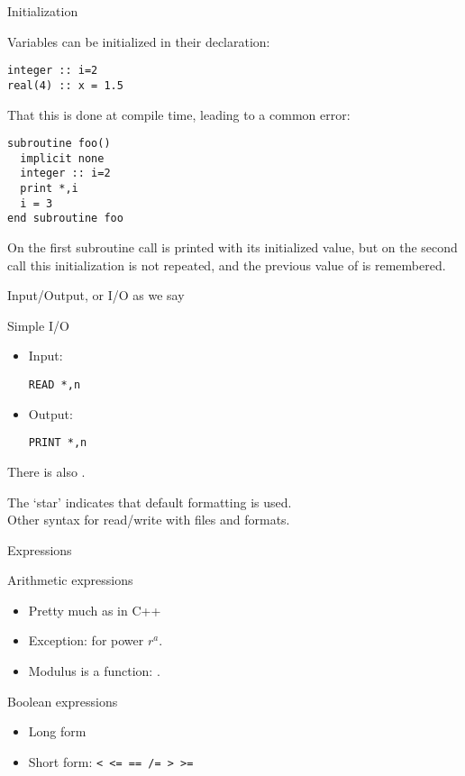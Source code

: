  {Initialization}

Variables can be initialized in their declaration:
\begin{lstlisting}
integer :: i=2
real(4) :: x = 1.5
\end{lstlisting}

That this is done at compile time, leading to a common error:
\begin{lstlisting}
subroutine foo()
  implicit none
  integer :: i=2
  print *,i
  i = 3
end subroutine foo
\end{lstlisting}
On the first subroutine call  is printed with its initialized
value, but on the second call this initialization is not repeated, and
the previous value of  is remembered.

 {Input/Output, or I/O as we say}
\label{sec:fio}

\begin{block}{Simple I/O}
  \label{sl:frw}
  \begin{itemize}
  \item Input: 
\begin{lstlisting}
READ *,n
\end{lstlisting}
\item Output:
\begin{lstlisting}
PRINT *,n
\end{lstlisting}
  \end{itemize}
  There is also .

  The `star' indicates that default formatting is used.\\
  Other syntax for read/write with files and formats.
\end{block}

 {Expressions}
\label{sec:fexpr}

\begin{block}{Arithmetic expressions}
  \label{sl:farith}
  \begin{itemize}
  \item Pretty much as in C++
  \item Exception:  for power $r^a$.
  \item Modulus is a function: .
  \end{itemize}
\end{block}

\begin{block}{Boolean expressions}
  \label{sl:fbool}
  \begin{itemize}
  \item 
    Long form
  \item Short form:
    \verb+< <= == /= > >=+
  \end{itemize}
\end{block}

